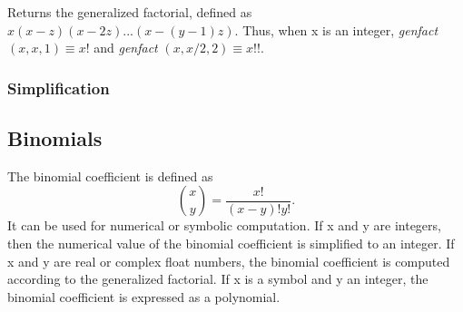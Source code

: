\documentclass[../Maxima_Workbook.tex]{subfiles}
\begin{document}
\lzz {} \hfill \tcr{[function]}

\lz Returns the generalized factorial, defined as $ x (x-z) (x - 2 z) ... (x - (y - 1) z) $. Thus, when x is an integer, \emph{genfact} $ (x, x, 1) \equiv x! $ and \emph{genfact} $ (x, x/2, 2) \equiv x!! $.

\subsubsection{Simplification}

\subsection{Binomials}

\lz {} \hfill \tcr{[function]}

\lz The binomial coefficient is defined as
\begin{equation*}
	\binom{x}{y} = \frac{x!}{(x-y)! y!}.
\end{equation*}
It can be used for numerical or symbolic computation. If x and y are integers, then the numerical value of the binomial coefficient is simplified to an integer. If x and y are real or complex float numbers, the binomial coefficient is computed according to the generalized factorial. If x is a symbol and y an integer, the binomial coefficient is expressed as a polynomial.
\end{document}
